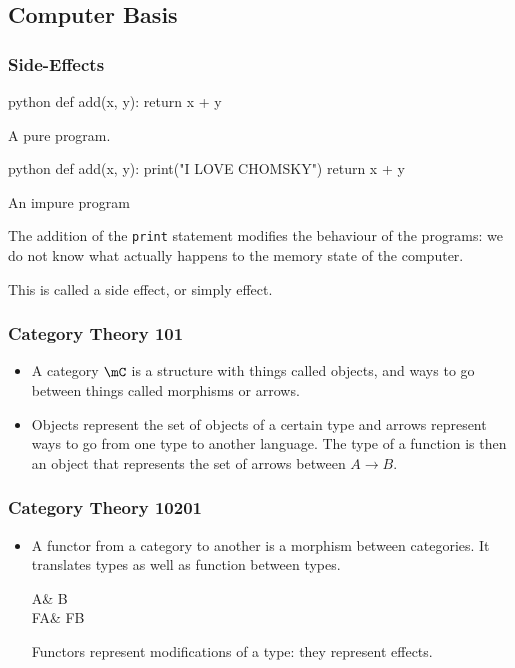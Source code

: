 \documentclass[math, english, info]{beamercours}
\begin{document}
\subsection{Computer Basis}
\begin{frame}[fragile]
	\frametitle{Side-Effects}
	\begin{center}
		\begin{minipage}[b]{.45\textwidth}
			\begin{code}{python}
				def add(x, y):
				return x + y
			\end{code}
			\centering
			A pure program.
		\end{minipage}
		\begin{minipage}[b]{.45\textwidth}
			\begin{code}{python}
				def add(x, y):
				print("I LOVE CHOMSKY")
				return x + y
			\end{code}
			\centering
			An impure program
		\end{minipage}
	\end{center}
	\pause
	The addition of the \texttt{print} statement modifies the behaviour of the
	programs: we do not know what actually happens to the memory state of the
	computer.

	This is called a side effect, or simply effect.
\end{frame}

\begin{frame}
	\frametitle{Category Theory 101}
	\begin{itemize}
		\item A category $\mC$ is a structure with things called objects, and
		      ways to go between things called morphisms or arrows.
		      \pause
		\item Objects represent the set of objects of a certain type and arrows
		      represent ways to go from one type to another language.
		      The type of a function is then an object that represents the set
		      of arrows between $A \to B$.
	\end{itemize}
\end{frame}

\begin{frame}[fragile]
	\frametitle{Category Theory 10201}
	\begin{itemize}
		\item A functor from a category to another is a morphism between
		      categories.
		      It translates types as well as function between types.
		      \pause
		      \begin{category}
			      A\ar[r, "\phi"]\ar[d, "F"'] & B\ar[d, "F"] \\
			      FA\ar[r, "F\phi"'] & FB
		      \end{category}
		      Functors represent modifications of a type: they represent effects.
	\end{itemize}
\end{frame}
\end{document}
